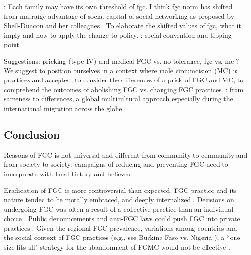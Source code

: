 \documentclass[12pt,]{article}
\begin{document}
\cite{EffeVoge15}:  Each family may have its own threshold of fgc. I think fgc norm has shifted from marraige advantage of social capital of social networking as proposed by Shell-Duncon and her colleagues \cite{ShelWand11}.  To elaborate the shifted values of fgc, what it imply and how to apply the change to policy.
\cite{CentBeck18}:  social convention and tipping point




Suggestions: pricking (type IV\cite{WHO08})\cite{WahlJohn17a, WahlJohn17b} and medical FGC \cite{KimaShell18} vs. no-tolerance, fgc vs. mc \cite{WahlEsse18}?  We suggest to position ourselves in a context where male circumcision (MC) is practices and accepted; to consider the differences of a prick of FGC and MC; to comprehend the outcomes of abolishing FGC vs. changing FGC practices.
\cite{WahlEsse18}:  from sameness to differences, a global multicultural approach especially during the international migration across the globe.


\subsection{Conclusion}\label{Conclusion}

Reasons of FGC is not universal and different from community to community and from society to society; campaigns of reducing and preventing FGC need to incorporate with local history and believes.

Eradication of FGC is more controversial than expected.  FGC practice and its nature tended to be morally embraced, and deeply internalized \cite{SchuLien13}.  Decisions on undergoing FGC was often a result of a collective practice than an individual choice \cite{Dell04, Hayf06, FreyJoh07, KandMwek09, Mack96, Mack06, ShelHern06, ShelWand11, YirgKass12}. Public denouncements and anti-FGC laws could push FGC into private practices \cite{GaluKama15, VanCoen17}.  Given the regional FGC prevalence, variations among countries and the social context of FGC practices (e.g., see Burkina Faso \cite{KarmKand11} vs. Nigeria \cite{KandNwak09}), a ``one size fits all" strategy for the abandonment of FGMC would not be effective \cite{JohaDiop13, YodeWang13}.
\end{document}
